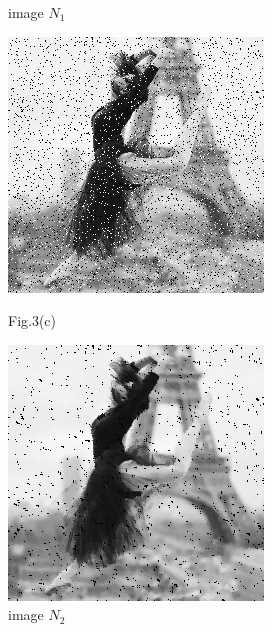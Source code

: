 \documentclass[12pt,a4paper,notitlepage,oneside,amsmath,amssymb]{article}
\begin{document}
\begin{CJK*}{UTF8}{bkai}
\begin{enumerate}[label=(\alph*)]
\begin{figure}[hbt!]
\begin{minipage}{.25\textwidth}
              \caption*{image \(N_1\)}
            \end{minipage}%
            \begin{minipage}{.25\textwidth}
              \centering
              \includegraphics[width=.97\linewidth]{sample5}
              \caption*{Fig.3(c)}
            \end{minipage}%
            \begin{minipage}{.25\textwidth}
              \centering
              \includegraphics[width=.97\linewidth]{imageN2}
              \caption*{image \(N_2\)}
            \end{minipage}
          \end{figure}


\end{enumerate}
\end{CJK*}
\end{document}
